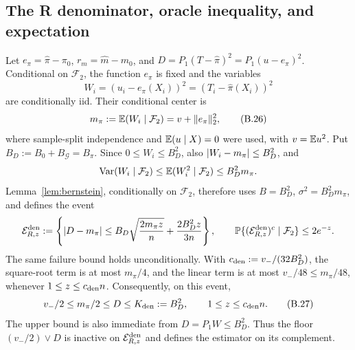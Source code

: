 \subsection{The R denominator, oracle inequality, and expectation}
\label{app:upper-r-oracle}

Let \(e_\pi=\widehat\pi-\pi_0\), \(r_m=\widehat m-m_0\), and
\(D=P_1(T-\widehat\pi)^2=P_1(u-e_\pi)^2\).  Conditional on
\(\mathcal F_2\), the function \(e_\pi\) is fixed and the variables
\[
 W_i=(u_i-e_\pi(X_i))^2=(T_i-\widehat\pi(X_i))^2
\]
are conditionally iid.  Their conditional center is
\[
 m_\pi:=\mathbb E(W_i\mid\mathcal F_2)
 =v+\lVert e_\pi\rVert_2^2,
 \tag{B.26}
\]
where sample-split independence and \(\mathbb E(u\mid X)=0\) were used,
with \(v=\mathbb E u^2\).  Put \(B_D:=B_0+B_{\mathcal G}=B_\pi\).  Since
\(0\le W_i\le B_D^2\), also
\(\lvert W_i-m_\pi\rvert\le B_D^2\), and
\[
 \operatorname{Var}(W_i\mid\mathcal F_2)
 \le\mathbb E(W_i^2\mid\mathcal F_2)\le B_D^2m_\pi.
\]
Lemma~\ref{lem:bernstein}, conditionally on \(\mathcal F_2\), therefore
uses \(B=B_D^2\), \(\sigma^2=B_D^2m_\pi\), and defines the event
\[
 \mathcal E_{R,z}^{\rm den}:=
 \left\{\lvert D-m_\pi\rvert\le
 B_D\sqrt{\frac{2m_\pi z}{n}}+\frac{2B_D^2z}{3n}\right\},
 \qquad
 \mathbb P\{(\mathcal E_{R,z}^{\rm den})^c\mid\mathcal F_2\}\le2e^{-z}.
\]
The same failure bound holds unconditionally.  With
\(c_{\rm den}:=v_-/(32B_D^2)\), the square-root term is at most
\(m_\pi/4\), and the linear term is at most
\(v_-/48\le m_\pi/48\), whenever
\(1\le z\le c_{\rm den}n\).  Consequently, on this event,
\begin{equation}
 v_-/2\le m_\pi/2\le D\le K_{\rm den}:=B_D^2,
 \qquad 1\le z\le c_{\rm den}n.
 \tag{B.27}
\end{equation}
The upper bound is also immediate from \(D=P_1W\le B_D^2\).  Thus the
floor \((v_-/2)\vee D\) is inactive on
\(\mathcal E_{R,z}^{\rm den}\) and defines the estimator on its complement.

